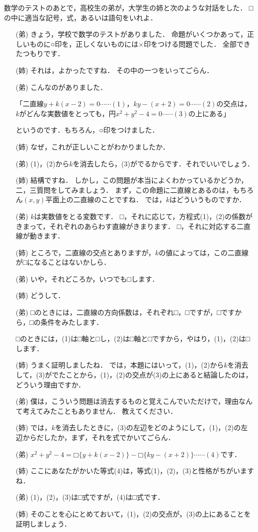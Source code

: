 \documentclass[../../main.tex]{subfiles}
\begin{document}
数学のテストのあとで，高校生の弟が，大学生の姉と次のような対話をした．
□の中に適当な記号，式，あるいは語句をいれよ．
\begin{enumerate}
  \item [(弟)]きょう，学校で数学のテストがありました．
    命題がいくつかあって，正しいものに○印を，正しくないものには×印をつける問題でした．
    全部できたつもりです．
  \item [(姉)]それは，よかったですね．
    その中の一つをいってごらん．
  \item [(弟)]こんなのがありました．

    「二直線$y+k(x-2)=0\cdots\cdots(1)$，$ky-(x+2)=0\cdots\cdots(2)$の交点は，
    $k$がどんな実数値をとっても，円$x^2+y^2-4=0\cdots\cdots(3)$の上にある」

    というのです．もちろん，○印をつけました．
  \item [(姉)]なぜ，これが正しいことがわかりましたか．
  \item [(弟)](1)，(2)から$k$を消去したら，(3)がでるからです．それでいいでしょう．
  \item [(姉)]結構ですね．
    しかし，この問題が本当によくわかっているかどうか，二，三質問をしてみましょう．
    まず，この命題に二直線とあるのは，もちろん$(x,y)$平面上の二直線のことですね．
    では，$k$はどういうものですか．
  \item [(弟)]$k$は実数値をとる変数です．
    □，それに応じて，方程式(1)，(2)の係数がきまって，それぞれのあらわす直線がきまります．
    □，それに対応する二直線が動きます．
  \item [(姉)]ところで，二直線の交点とありますが，$k$の値によっては，この二直線が□になることはないかしら．
  \item [(弟)]いや，それどころか，いつでも□します．
  \item [(姉)]どうして．
  \item [(弟)]□のときには，二直線の方向係数は，それぞれ□，□ですが，□ですから，□の条件をみたします．

    □のときには，(1)は□軸と□し，(2)は□軸と□ですから，やはり，(1)，(2)は□します．
  \item [(姉)]うまく証明しましたね．
    では，本題にはいって，(1)，(2)から$k$を消去して，(3)がでたことから，(1)，(2)の交点が(3)の上にあると結論したのは，どういう理由ですか．
  \item [(弟)]僕は，こういう問題は消去するものと覚えこんでいただけで，理由なんて考えてみたこともありません．
    教えてください．
  \item [(姉)]では，$k$を消去したときに，(3)の左辺をどのようにして，(1)，(2)の左辺からだしたか，まず，それを式でかいてごらん．
  \item [(弟)]$x^2+y^2-4= \text{□} \{ y+k(x-2) \} - \text{□} \{ ky-(x+2) \} \cdots\cdots(4)$です．
  \item [(姉)]ここにあなたがかいた等式(4)は，等式(1)，(2)，(3)と性格がちがいますね．
  \item [(弟)](1)，(2)，(3)は□式ですが，(4)は□式です．
  \item [(姉)]そのことを心にとめておいて，(1)，(2)の交点が，(3)の上にあることを証明しましょう．


\end{enumerate}
\end{document}
